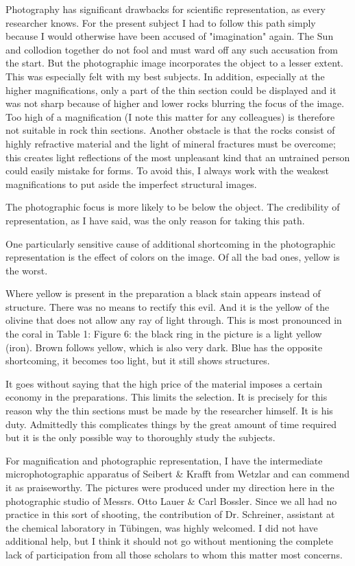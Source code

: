 \documentclass[a4paper, 12pt, oneside]{article}
\begin{document}
Photography has significant drawbacks for scientific representation, as every researcher knows. For the present subject I had to follow this path simply because I would otherwise have been accused of "imagination" again. The Sun and collodion together do not fool and must ward off any such accusation from the start. But the photographic image incorporates the object to a lesser extent. This was especially felt with my best subjects. In addition, especially at the higher magnifications, only a part of the thin section could be displayed and it was not sharp because of higher and lower rocks blurring the focus of the image. Too high of a magnification (I note this matter for any colleagues) is therefore not suitable in rock thin sections. Another obstacle is that the rocks consist of highly refractive material and the light of mineral fractures must be overcome; this creates light reflections of the most unpleasant kind that an untrained person could easily mistake for forms. To avoid this, I always work with the weakest magnifications to put aside the imperfect structural images.

The photographic focus is more likely to be below the object. The credibility of representation, as I have said, was the only reason for taking this path.

One particularly sensitive cause of additional shortcoming in the photographic representation is the effect of colors on the image. Of all the bad ones, yellow is the worst.

Where yellow is present in the preparation a black stain appears instead of structure. There was no means to rectify this evil. And it is the yellow of the olivine that does not allow any ray of light through. This is most pronounced in the coral in Table 1: Figure 6: the black ring in the picture is a light yellow (iron). Brown follows yellow, which is also very dark. Blue has the opposite shortcoming, it becomes too light, but it still shows structures.

It goes without saying that the high price of the material imposes a certain economy in the preparations. This limits the selection. It is precisely for this reason why the thin sections must be made by the researcher himself. It is his duty. Admittedly this complicates things by the great amount of time required but it is the only possible way to thoroughly study the subjects.

For magnification and photographic representation, I have the intermediate microphotographic apparatus of Seibert \& Krafft from Wetzlar and can commend it as praiseworthy. The pictures were produced under my direction here in the photographic studio of Messrs. Otto Lauer \& Carl Bossler. Since we all had no practice in this sort of shooting, the contribution of Dr. Schreiner, assistant at the chemical laboratory in Tübingen, was highly welcomed. I did not have additional help, but I think it should not go without mentioning the complete lack of participation from all those scholars to whom this matter most concerns.
\end{document}
